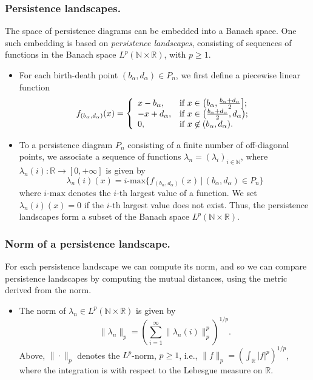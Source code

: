 \documentclass[11pt]{amsart}
\theoremstyle{definition}
\theoremstyle{remark}
\numberwithin{equation}{section}
\def\N{\mathbb{N}}
\def\R{\mathbb{R}}
\begin{document}
\subsubsection{Persistence landscapes.} The space of persistence diagrams can be embedded into a Banach space.
One such embedding is based on \emph{persistence landscapes}, consisting of sequences of functions in the  Banach space $L^p(\N\times \R)$, with $p\geq 1$.
\begin{itemize}\item For each birth-death point $(b_\alpha,d_\alpha) \in P_n$, we first define a piecewise linear function
\begin{equation}\label{eqn:landscape_1}
f_{(b_\alpha,d_\alpha)}(x)=\left\{
                          \begin{array}{ll}
                            x-b_\alpha, & \hbox{if $x\in\left(b_\alpha,\frac{b_\alpha+d_\alpha}{2}\right]$;} \\
                            -x+d_\alpha, & \hbox{if $x\in\left(\frac{b_\alpha+d_\alpha}{2},d_\alpha\right)$;} \\
                            0, & \hbox{if $x\not\in (b_\alpha, d_\alpha)$.}
                          \end{array}
                        \right.
\end{equation}

\item To a persistence diagram $P_n$ consisting of a finite number of off-diagonal
points, we associate a sequence of functions
$\lambda_n=(\lambda_i)_{i\in\mathbb{N}}$, where
$\lambda_n(i):\mathbb{R}\to[0,+\infty]$ is
given by
\begin{equation}\label{eqn:landscape_2} \lambda_n(i)(x)=i\textrm{-max}\{f_{(b_\alpha,d_\alpha)}(x)\,|\, (b_\alpha,d_\alpha)\in P_n\}
\end{equation}
where  $i\textrm{-max}$ denotes the $i$-th largest value of a  function.
We set $\lambda_n(i)(x) = 0$ if
the $i$-th largest value does not exist. Thus, the persistence landscapes form a subset of the Banach space $L^p(\N\times \R)$.
\end{itemize}


\subsubsection{Norm of a persistence landscape.}
For each persistence landscape we can compute its norm, and so we can compare persistence landscapes by computing the mutual distances, using the metric derived from the norm.
\begin{itemize}
\item The norm of $\lambda_n\in L^p(\N\times \R)$  is given by
\begin{equation}\label{eqn:landscape_3}\|\lambda_n\|_p=\left (\sum_{i=1}^{\infty}\|\lambda_n(i)\|_p^p\right)^{1/p}.\end{equation}
Above, $\|\cdot\|_p$ denotes the $L^p$-norm, $p\geq 1$, i.e., $\|f\|_p=\left ( \int _\mathbb{R} |f|^p\right )^{1/p}$, where the integration is with respect
to  the Lebesgue measure on $\R$.
\end{itemize}
\end{document}
